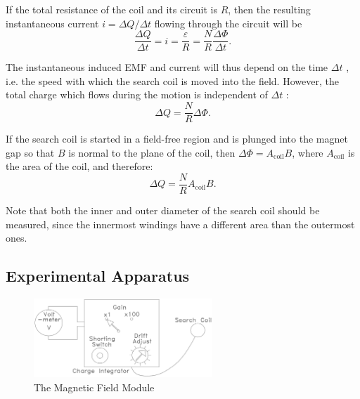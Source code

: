 If the total resistance of the coil and its circuit is $R$, then the resulting instantaneous current $i = \Delta Q / \Delta t$ flowing through the circuit will be
\begin{equation}
  \frac{\Delta Q}{\Delta t}=i=\frac{\varepsilon}{R}=\frac{N}{R}\frac{\Delta\Phi}{\Delta t}.
\end{equation}

The instantaneous induced EMF and current will thus depend on the time $\Delta t$ , i.e. the speed with which the search coil is moved into the field. However, the total charge which flows during the motion is independent of $\Delta t$ :
\begin{equation}
  \Delta Q=\frac{N}{R}\Delta\Phi.
\end{equation}

If the search coil is started in a field-free region and is plunged into the magnet gap so that $B$ is normal to the plane of the coil, then $\Delta \Phi = A_{\mathrm{coil}} B$, where $A_{\mathrm{coil}}$ is the area of the coil, and therefore:
\begin{equation}
  \Delta Q=\frac{N}{R}A_{\mathrm{coil}}B.
\end{equation}

Note that both the inner and outer diameter of the search coil should be measured, since the innermost windings have a different area than the outermost ones.

\subsection{Experimental Apparatus}
\begin{figure}[h]
\centering
\includegraphics[width=0.6\textwidth]{./Exp5/pic/image4.png}
\caption{The Magnetic Field Module}
\label{fig:module}
\end{figure} 

